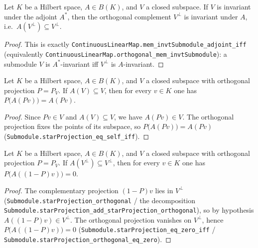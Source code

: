 \begin{lemma}
    \label{lem:orthogonal-invariant}
    \leanok
    Let $K$ be a Hilbert space, $A \in B(K)$, and $V$ a closed subspace. If $V$
    is invariant under the adjoint $A^*$, then the orthogonal complement
    $V^\perp$ is invariant under $A$, i.e.\ $A(V^\perp) \subseteq V^\perp$.
\end{lemma}
\begin{proof}
    This is exactly
    \texttt{ContinuousLinearMap.mem\_invtSubmodule\_adjoint\_iff} (equivalently
    \texttt{ContinuousLinearMap.orthogonal\_mem\_invtSubmodule}): a submodule $V$
    is $A^*$-invariant iff $V^\perp$ is $A$-invariant.
\end{proof}

\begin{lemma}
    \label{lem:proj-on-invariant}
    \leanok
    Let $K$ be a Hilbert space, $A \in B(K)$, and $V$ a closed subspace with
    orthogonal projection $P = P_V$. If $A(V) \subseteq V$, then for every
    $v \in K$ one has $P\bigl(A(P v)\bigr) = A(P v)$.
\end{lemma}
\begin{proof}
    Since $P v \in V$ and $A(V) \subseteq V$, we have $A(P v) \in V$. The
    orthogonal projection fixes the points of its subspace, so
    $P\bigl(A(P v)\bigr) = A(P v)$
    (\texttt{Submodule.starProjection\_eq\_self\_iff}).
\end{proof}

\begin{lemma}
    \label{lem:proj-on-orthogonal}
    \leanok
    Let $K$ be a Hilbert space, $A \in B(K)$, and $V$ a closed subspace with
    orthogonal projection $P = P_V$. If $A(V^\perp) \subseteq V^\perp$, then for
    every $v \in K$ one has $P\bigl(A((1 - P) v)\bigr) = 0$.
\end{lemma}
\begin{proof}
    The complementary projection $(1 - P)v$ lies in $V^\perp$
    (\texttt{Submodule.starProjection\_orthogonal} / the decomposition
    \texttt{Submodule.starProjection\_add\_starProjection\_orthogonal}), so by
    hypothesis $A((1 - P)v) \in V^\perp$. The orthogonal projection vanishes on
    $V^\perp$, hence $P\bigl(A((1 - P)v)\bigr) = 0$
    (\texttt{Submodule.starProjection\_eq\_zero\_iff} /
    \texttt{Submodule.starProjection\_orthogonal\_eq\_zero}).
\end{proof}

